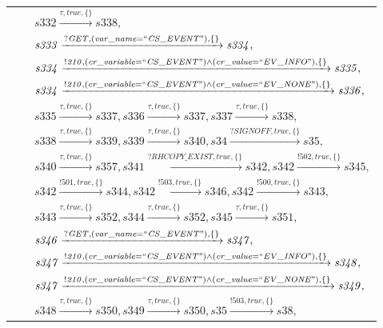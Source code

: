 \begin{tabular}{lcp{350px}}
& & $\mathit{s332}\xrightarrow{\mathit{\tau}, \mathit{true}, \{\}}\mathit{s338},$ \\
& & $\mathit{s333}\xrightarrow{\mathit{?GET}, \mathit{(var\_name = ``CS\_EVENT")}, \{\}}\mathit{s334},$ \\
& & $\mathit{s334}\xrightarrow{\mathit{!210}, \mathit{(cr\_variable = ``CS\_EVENT") \land (cr\_value = ``EV\_INFO")}, \{\}}\mathit{s335},$ \\
& & $\mathit{s334}\xrightarrow{\mathit{!210}, \mathit{(cr\_variable = ``CS\_EVENT") \land (cr\_value = ``EV\_NONE")}, \{\}}\mathit{s336},$ \\
& & $\mathit{s335}\xrightarrow{\mathit{\tau}, \mathit{true}, \{\}}\mathit{s337},\mathit{s336}\xrightarrow{\mathit{\tau}, \mathit{true}, \{\}}\mathit{s337},\mathit{s337}\xrightarrow{\mathit{\tau}, \mathit{true}, \{\}}\mathit{s338},$ \\
& & $\mathit{s338}\xrightarrow{\mathit{\tau}, \mathit{true}, \{\}}\mathit{s339},\mathit{s339}\xrightarrow{\mathit{\tau}, \mathit{true}, \{\}}\mathit{s340},\mathit{s34}\xrightarrow{\mathit{?SIGNOFF}, \mathit{true}, \{\}}\mathit{s35},$ \\
& & $\mathit{s340}\xrightarrow{\mathit{\tau}, \mathit{true}, \{\}}\mathit{s357},\mathit{s341}\xrightarrow{\mathit{?RHCOPY\_EXIST}, \mathit{true}, \{\}}\mathit{s342},\mathit{s342}\xrightarrow{\mathit{!502}, \mathit{true}, \{\}}\mathit{s345},$ \\
& & $\mathit{s342}\xrightarrow{\mathit{!501}, \mathit{true}, \{\}}\mathit{s344},\mathit{s342}\xrightarrow{\mathit{!503}, \mathit{true}, \{\}}\mathit{s346},\mathit{s342}\xrightarrow{\mathit{!500}, \mathit{true}, \{\}}\mathit{s343},$ \\
& & $\mathit{s343}\xrightarrow{\mathit{\tau}, \mathit{true}, \{\}}\mathit{s352},\mathit{s344}\xrightarrow{\mathit{\tau}, \mathit{true}, \{\}}\mathit{s352},\mathit{s345}\xrightarrow{\mathit{\tau}, \mathit{true}, \{\}}\mathit{s351},$ \\
& & $\mathit{s346}\xrightarrow{\mathit{?GET}, \mathit{(var\_name = ``CS\_EVENT")}, \{\}}\mathit{s347},$ \\
& & $\mathit{s347}\xrightarrow{\mathit{!210}, \mathit{(cr\_variable = ``CS\_EVENT") \land (cr\_value = ``EV\_INFO")}, \{\}}\mathit{s348},$ \\
& & $\mathit{s347}\xrightarrow{\mathit{!210}, \mathit{(cr\_variable = ``CS\_EVENT") \land (cr\_value = ``EV\_NONE")}, \{\}}\mathit{s349},$ \\
& & $\mathit{s348}\xrightarrow{\mathit{\tau}, \mathit{true}, \{\}}\mathit{s350},\mathit{s349}\xrightarrow{\mathit{\tau}, \mathit{true}, \{\}}\mathit{s350},\mathit{s35}\xrightarrow{\mathit{!503}, \mathit{true}, \{\}}\mathit{s38},$ \\

\end{tabular}

